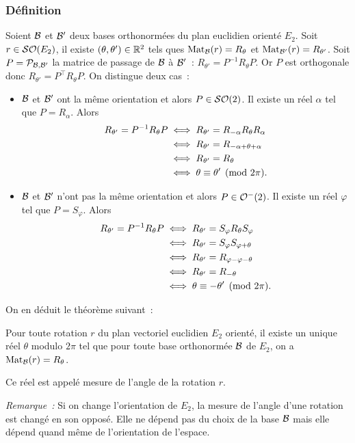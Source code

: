 \subsubsection{Définition}

Soient $\mathcal{B}$ et $\mathcal{B}'$ deux bases orthonormées du plan euclidien orienté $E_2$. Soit $r \in \mathcal{SO}\!\left(E_2\right)$, il existe $(\theta, \theta') \in \mathbb{R}^2$ tels ques $\mathrm{Mat}_{\mathcal{B}}(r)=R_\theta$ et $\mathrm{Mat}_{\mathcal{B}'}(r)=R_{\theta'}$. Soit $P=\mathcal{P}_{\mathcal{B},\mathcal{B}'}$ la matrice de passage de $\mathcal{B}$ à $\mathcal{B}'$~: $R_{\theta'}=P^{-1} R_{\theta} P$. Or $P$ est orthogonale donc $R_{\theta'}=P^\top R_{\theta} P$. On distingue deux cas~:
\begin{itemize}
\item $\mathcal{B}$ et $\mathcal{B}'$ ont la même orientation et alors $P \in \mathcal{SO}\!\left(2\right)$. Il existe un réel $\alpha$ tel que $P=R_\alpha$. Alors
  \begin{align}
    R_{\theta'}=P^{-1} R_{\theta} P &\iff R_{\theta'}=R_{-\alpha}R_{\theta}R_{\alpha} \\
    &\iff R_{\theta'} = R_{-\alpha+\theta+\alpha}\\
    &\iff R_{\theta'} =R_{\theta}\\
    &\iff \theta \equiv \theta' \pmod {2\pi}.
  \end{align}
\item $\mathcal{B}$ et $\mathcal{B}'$ n'ont pas la même orientation et alors $P \in \mathcal{O}^{-}\!\left(2\right)$. Il existe un réel $\varphi$ tel que $P=S_\varphi$. Alors
  \begin{align}
    R_{\theta'}=P^{-1} R_{\theta} P &\iff R_{\theta'}=S_{\varphi}R_{\theta}S_{\varphi} \\
    &\iff R_{\theta'} = S_{\varphi}S_{\varphi+\theta}\\
    &\iff R_{\theta'} = R_{\varphi-\varphi-\theta}\\    
    &\iff R_{\theta'} =R_{-\theta}\\
    &\iff \theta \equiv -\theta' \pmod {2\pi}.
  \end{align}
\end{itemize}
On en déduit le théorème suivant~:
\begin{theo}
  Pour toute rotation $r$ du plan vectoriel euclidien $E_2$ orienté, il existe un unique réel $\theta$ modulo $2\pi$ tel que pour toute base orthonormée $\mathcal{B}$ de $E_2$, on a $\mathrm{Mat}_{\mathcal{B}}(r)=R_\theta$.

  Ce réel est appelé mesure de l'angle de la rotation $r$.
\end{theo}
\emph{Remarque~:} Si on change l'orientation de $E_2$, la mesure de l'angle d'une rotation est changé en son opposé. Elle ne dépend pas du choix de la base $\mathcal{B}$ mais elle dépend quand même de l'orientation de l'espace.

